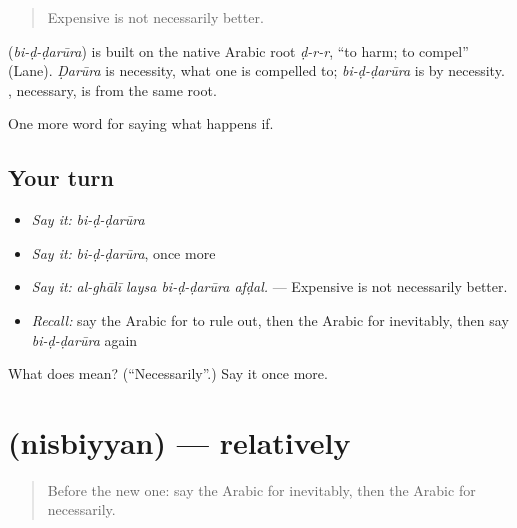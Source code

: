 \begin{quote}
Expensive is not necessarily better.
\end{quote}

\begin{cousinweb}
\textbf{} (\emph{bi-ḍ-ḍarūra}) is built on the native Arabic root \emph{ḍ-r-r}, \textquotedblleft{}to harm; to compel\textquotedblright{} (Lane). \emph{Ḍarūra} is necessity, what one is compelled to; \emph{bi-ḍ-ḍarūra} is by necessity. , necessary, is from the same root.
\end{cousinweb}

\begin{grammarlens}[title={What you've built}]
One more word for saying what happens if.
\end{grammarlens}

\subsection*{Your turn}
\begin{itemize}
\raggedright
  \item \emph{Say it:} \emph{bi-ḍ-ḍarūra}
  \item \emph{Say it:} \emph{bi-ḍ-ḍarūra}, once more
  \item \emph{Say it:} \emph{al-ghālī laysa bi-ḍ-ḍarūra afḍal.} — Expensive is not necessarily better.
  \item \emph{Recall:} say the Arabic for to rule out, then the Arabic for inevitably, then say \emph{bi-ḍ-ḍarūra} again
\end{itemize}

\begin{tcolorbox}[breakable,colback=teal!4,colframe=teal!35!black,title={Before you move on}]
What does  mean? (\textquotedblleft{}Necessarily\textquotedblright{}.) Say it once more.
\end{tcolorbox}
\section[\texorpdfstring{\ar{نسبيا} (nisbiyyan)}{نسبيا (nisbiyyan)}]{ (nisbiyyan) — relatively}

\label{lesson:AR-C402-nisbiyyan}



\begin{quote}
Before the new one: say the Arabic for inevitably, then the Arabic for necessarily.
\end{quote}

